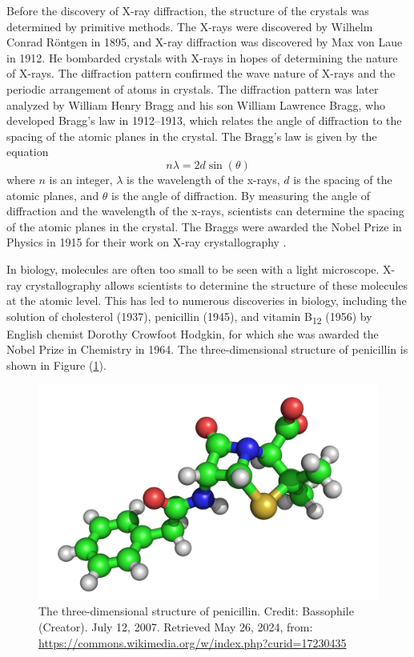 \documentclass[10pt]{article}
\begin{document}
Before the discovery of X-ray diffraction, the structure of the crystals was determined by primitive methods. The X-rays were discovered by Wilhelm Conrad Röntgen in 1895, and X-ray diffraction was discovered by Max von Laue in 1912. He bombarded crystals with X-rays in hopes of determining the nature of X-rays. The diffraction pattern confirmed the wave nature of X-rays and the periodic arrangement of atoms in crystals. The diffraction pattern was later analyzed by William Henry Bragg and his son William Lawrence Bragg, who developed Bragg's law in 1912--1913, which relates the angle of diffraction to the spacing of the atomic planes in the crystal. The Bragg's law is given by the equation
\begin{equation}
  n \lambda = 2 d \sin(\theta)
\end{equation}
where $n$ is an integer, $\lambda$ is the wavelength of the x-rays, $d$ is the spacing of the atomic planes, and $\theta$ is the angle of diffraction. By measuring the angle of diffraction and the wavelength of the x-rays, scientists can determine the spacing of the atomic planes in the crystal. The Braggs were awarded the Nobel Prize in Physics in 1915 for their work on X-ray crystallography \cite{Bragg_1913}.

In biology, molecules are often too small to be seen with a light microscope. X-ray crystallography allows scientists to determine the structure of these molecules at the atomic level. This has led to numerous discoveries in biology, including the solution of cholesterol (1937), penicillin (1945), and vitamin B\textsubscript{12} (1956) by English chemist Dorothy Crowfoot Hodgkin, for which she was awarded the Nobel Prize in Chemistry in 1964. The three-dimensional structure of penicillin is shown in Figure (\ref{fig:2}).

\begin{figure}[ht]
  \centering
  \includegraphics[scale=0.2]{figures/f2.png}
  \caption{The three-dimensional structure of penicillin. Credit: Bassophile (Creator). July 12, 2007. Retrieved May 26, 2024, from: \url{https://commons.wikimedia.org/w/index.php?curid=17230435}}
  \label{fig:2}
\end{figure}
\end{document}
